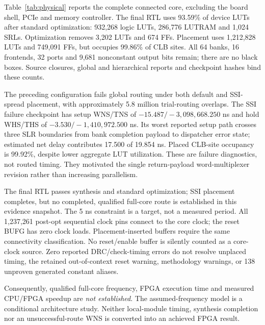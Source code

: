Table~\ref{tab:physical} reports the complete connected core, excluding the board shell, PCIe and memory controller. The final RTL uses 93.59\% of device LUTs after standard optimization: 932,268 logic LUTs, 286,776 LUTRAM and 1,024 SRLs. Optimization removes 3,202 LUTs and 674 FFs. Placement uses 1,212,828 LUTs and 749,091 FFs, but occupies 99.86\% of CLB sites. All 64 banks, 16 frontends, 32 ports and 9,681 nonconstant output bits remain; there are no black boxes. Source closures, global and hierarchical reports and checkpoint hashes bind these counts.

The preceding configuration fails global routing under both default and SSI-spread placement, with approximately 5.8 million trial-routing overlaps. The SSI failure checkpoint has setup WNS/TNS of $-15.487/-3{,}098{,}668.250$ ns and hold WHS/THS of $-3.530/-1{,}410{,}972.500$ ns. Its worst reported setup path crosses three SLR boundaries from bank completion payload to dispatcher error state; estimated net delay contributes 17.500 of 19.854 ns. Placed CLB-site occupancy is 99.92\%, despite lower aggregate LUT utilization. These are failure diagnostics, not routed timing. They motivated the single return-payload word-multiplexer revision rather than increasing parallelism.

The final RTL passes synthesis and standard optimization; SSI placement completes, but no completed, qualified full-core route is established in this evidence snapshot. The 5 ns constraint is a target, not a measured period. All 1,237,261 post-opt sequential clock pins connect to the core clock; the reset BUFG has zero clock loads. Placement-inserted buffers require the same connectivity classification. No reset/enable buffer is silently counted as a core-clock source. Zero reported DRC/check-timing errors do not resolve unplaced timing, the retained out-of-context reset warning, methodology warnings, or 138 unproven generated constant aliases.

Consequently, qualified full-core frequency, FPGA execution time and measured CPU/FPGA speedup are \emph{not established}. The assumed-frequency model is a conditional architecture study. Neither local-module timing, synthesis completion nor an unsuccessful-route WNS is converted into an achieved FPGA result.
